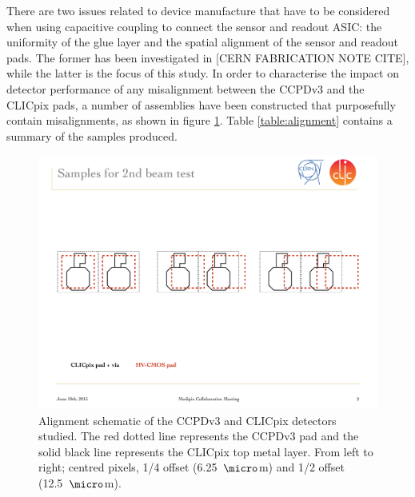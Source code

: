 There are two issues related to device manufacture that have to be considered when using capacitive coupling to connect the sensor and readout ASIC: the uniformity of the glue layer and the spatial alignment of the sensor and readout pads.  The former has been investigated in [CERN FABRICATION NOTE CITE], while the latter is the focus of this study.  In order to characterise the impact on detector performance of any misalignment between the CCPDv3 and the CLICpix pads, a number of assemblies have been constructed that purposefully contain misalignments, as shown in figure \ref{fig:alignment}.  Table \ref{table:alignment} contains a summary of the samples produced.

\begin{figure}[h!]
\centering
\includegraphics[width=1.0\textwidth]{CLICdpVertex/Plots/misalignedPads.pdf}
\caption[Alignment schematic of the CCPDv3 and CLICpix detectors studied.  The red dotted line represents the CCPDv3 pad and the solid black line represents the CLICpix top metal layer.  From left to right; centred pixels, 1/4 offset (6.25~${\micro}$m) and 1/2 offset (12.5~${\micro}$m).]{Alignment schematic of the CCPDv3 and CLICpix detectors studied.  The red dotted line represents the CCPDv3 pad and the solid black line represents the CLICpix top metal layer.  From left to right; centred pixels, 1/4 offset (6.25~${\micro}$m) and 1/2 offset (12.5~${\micro}$m).}
\label{fig:alignment}
\end{figure}

